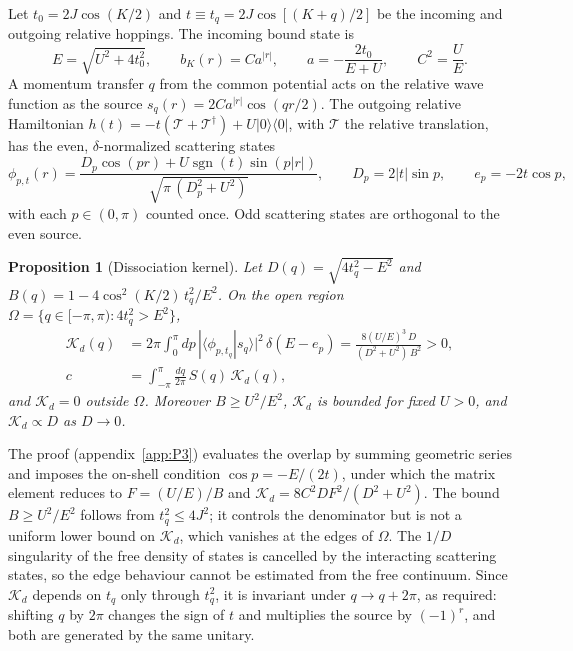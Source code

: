 \documentclass[12pt,a4paper]{article}
\newtheorem{proposition}{Proposition}
\theoremstyle{remark}
\newcommand{\Kd}{\mathcal{K}_d}
\newcommand{\sgn}{\operatorname{sgn}}
\begin{document}
Let $t_0=2J\cos(K/2)$ and $t\equiv t_q=2J\cos[(K+q)/2]$ be the incoming and outgoing relative hoppings. The incoming bound state is~\cite{ValientePetrosyan2008}
\begin{equation}\label{eq:bound}
E=\sqrt{U^2+4t_0^2},\qquad b_K(r)=C a^{|r|},\qquad a=-\frac{2t_0}{E+U},\qquad C^2=\frac{U}{E}.
\end{equation}
A momentum transfer $q$ from the common potential acts on the relative wave function as the source $s_q(r)=2Ca^{|r|}\cos(qr/2)$. The outgoing relative Hamiltonian $h(t)=-t(\mathcal{T}+\mathcal{T}^\dagger)+U|0\rangle\langle0|$, with $\mathcal{T}$ the relative translation, has the even, $\delta$-normalized scattering states
\begin{equation}\label{eq:scattering}
\phi_{p,t}(r)=\frac{D_p\cos(pr)+U\sgn(t)\sin(p|r|)}{\sqrt{\pi\,(D_p^2+U^2)}},\qquad D_p=2|t|\sin p,\qquad e_p=-2t\cos p,
\end{equation}
with each $p\in(0,\pi)$ counted once. Odd scattering states are orthogonal to the even source.

\begin{proposition}[Dissociation kernel]\label{prop:kernel}
Let $D(q)=\sqrt{4t_q^2-E^2}$ and $B(q)=1-4\cos^2(K/2)\,t_q^2/E^2$. On the open region $\Omega=\{q\in[-\pi,\pi):4t_q^2>E^2\}$,
\begin{equation}\label{eq:kernel}
\begin{aligned}
\Kd(q)&=2\pi\int_0^\pi dp\,|\langle\phi_{p,t_q}|s_q\rangle|^2\,\delta(E-e_p)
=\frac{8(U/E)^3\,D}{(D^2+U^2)\,B^2}>0,\\
c&=\int_{-\pi}^{\pi}\frac{dq}{2\pi}\,S(q)\,\Kd(q),
\end{aligned}
\end{equation}
and $\Kd=0$ outside $\Omega$. Moreover $B\ge U^2/E^2$, $\Kd$ is bounded for fixed $U>0$, and $\Kd\propto D$ as $D\to0$.
\end{proposition}

The proof (appendix~\ref{app:P3}) evaluates the overlap by summing geometric series and imposes the on-shell condition $\cos p=-E/(2t)$, under which the matrix element reduces to $F=(U/E)/B$ and $\Kd=8C^2DF^2/(D^2+U^2)$. The bound $B\ge U^2/E^2$ follows from $t_q^2\le4J^2$; it controls the denominator but is not a uniform lower bound on $\Kd$, which vanishes at the edges of $\Omega$. The $1/D$ singularity of the free density of states is cancelled by the interacting scattering states, so the edge behaviour cannot be estimated from the free continuum. Since $\Kd$ depends on $t_q$ only through $t_q^2$, it is invariant under $q\to q+2\pi$, as required: shifting $q$ by $2\pi$ changes the sign of $t$ and multiplies the source by $(-1)^r$, and both are generated by the same unitary.
\end{document}
